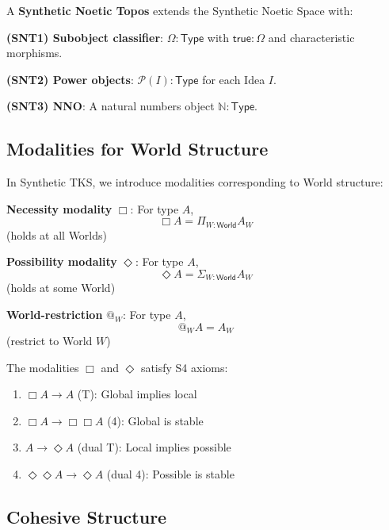 \begin{definition}
\label{def:synthetic-noetic-topos}
A \textbf{Synthetic Noetic Topos} extends the Synthetic Noetic Space with:

\textbf{(SNT1) Subobject classifier}: $\Omega : \mathsf{Type}$ with
$\mathsf{true} : \Omega$ and characteristic morphisms.

\textbf{(SNT2) Power objects}: $\mathcal{P}(I) : \mathsf{Type}$ for each Idea $I$.

\textbf{(SNT3) NNO}: A natural numbers object $\mathbb{N} : \mathsf{Type}$.
\end{definition}

\subsection{Modalities for World Structure}
\label{subsec:modalities-world}

\begin{definition}
\label{def:world-modalities}
In Synthetic TKS, we introduce modalities corresponding to World structure:

\textbf{Necessity modality} $\Box$: For type $A$,
\[
  \Box A = \Pi_{W : \mathsf{World}} A_W
\]
(holds at all Worlds)

\textbf{Possibility modality} $\Diamond$: For type $A$,
\[
  \Diamond A = \Sigma_{W : \mathsf{World}} A_W
\]
(holds at some World)

\textbf{World-restriction} $@_W$: For type $A$,
\[
  @_W A = A_W
\]
(restrict to World $W$)
\end{definition}

\begin{proposition}[S4 Structure]
\label{prop:s4-synthetic}
The modalities $\Box$ and $\Diamond$ satisfy S4 axioms:
\begin{enumerate}
  \item $\Box A \to A$ (T): Global implies local
  \item $\Box A \to \Box \Box A$ (4): Global is stable
  \item $A \to \Diamond A$ (dual T): Local implies possible
  \item $\Diamond \Diamond A \to \Diamond A$ (dual 4): Possible is stable
\end{enumerate}
\end{proposition}

\subsection{Cohesive Structure}
\label{subsec:cohesive-structure}

